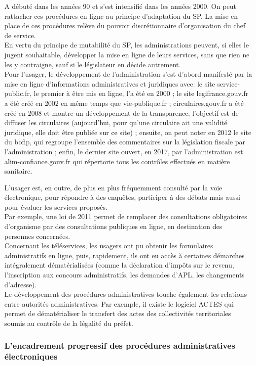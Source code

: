 \documentclass[10pt, a4paper, openany]{book}
\begin{document}
A débuté dans les années 90 et s'est intensifié dans les années 2000. On peut rattacher ces procédures en ligne au principe d'adaptation du SP. La mise en place de ces procédures relève du pouvoir discrétionnaire d'organisation du chef de service. \\
En vertu du principe de mutabilité du SP, les administrations peuvent, si elles le jugent souhaitable, développer la mise en ligne de leurs services, sans que rien ne les y contraigne, sauf si le législateur en décide autrement. \\
Pour l'usager, le développement de l'administration s'est d'abord manifesté par la mise en ligne d'informations administratives et juridiques avec: le site service-public.fr, le premier à être mis en ligne, l'a été en 2000 ; le site legifrance.gouv.fr a été créé en 2002 en même temps que vie-publique.fr ; circulaires.gouv.fr a été créé en 2008 et montre un développement de la transparence, l'objectif est de diffuser les circulaires (aujourd'hui, pour qu'une circulaire ait une validité juridique, elle doit être publiée sur ce site) ; ensuite, on peut noter en 2012 le site du bofip, qui regroupe l'ensemble des commentaires sur la législation fiscale par l'administration ; enfin, le dernier site ouvert, en 2017, par l'administration est alim-confiance.gouv.fr qui répertorie tous les contrôles effectués en matière sanitaire.


L'usager est, en outre, de plus en plus fréquemment consulté par la voie électronique, pour répondre à des enquêtes, participer à des débats mais aussi pour évaluer les services proposés. \\
Par exemple, une loi de 2011 permet de remplacer des consultations obligatoires d'organisme par des consultations publiques en ligne, en destination des personnes concernées. \\
Concernant les téléservices, les usagers ont pu obtenir les formulaires administratifs en ligne, puis, rapidement, ils ont eu accès à certaines démarches intégralement dématérialisées (comme la déclaration d'impôts sur le revenu, l'inscription aux concours administratifs, les demandes d'APL, les changements d'adresse). \\
Le développement des procédures administratives touche également les relations entre autorités administratives. Par exemple, il existe le logiciel ACTES qui permet de dématérialiser le transfert des actes des collectivités territoriales soumis au contrôle de la légalité du préfet. 

\subsubsection{L'encadrement progressif des procédures administratives électroniques}
\end{document}
